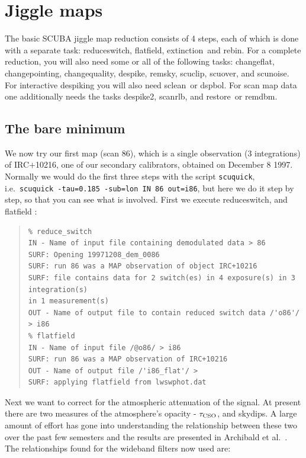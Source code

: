 \documentclass[twoside,11pt]{article}
\newenvironment{myquote}{\begin{quote}\begin{small}}{\end{small}\end{quote}}
\newcommand{\task}[1]{\textsf{#1}}
\newcommand{\rebin}{\xref{\task{rebin}}{sun216}{REBIN}}
\newcommand{\remdbm}{\xref{\task{remdbm}}{sun216}{REMDBM}}
\newcommand{\chgqual}{\xref{\task{change\_\-qua\-lity}}{sun216}{CHANGE_QUALITY}}
\newcommand{\chgflat}{\xref{\task{change\_flat}}{sun216}{CHANGE_FLAT}}
\newcommand{\chgpnt}{\xref{\task{change\_pointing}}{sun216}{CHANGE_POINTING}}
\newcommand{\desp}{\xref{\task{despike}}{sun216}{DESPIKE}}
\newcommand{\dspbol}{\xref{\task{dspbol}}{sun216}{DSPBOL}}
\newcommand{\resw}{\xref{\task{reduce\_switch}}{sun216}{REDUCE_SWITCH}}
\newcommand{\flatf}{\xref{\task{flatfield}}{sun216}{FLATFIELD}}
\newcommand{\scanrlb}{\xref{\task{scan\_rlb}}{sun216}{SCAN_RLB}}
\newcommand{\ext}{\xref{\task{extinction}}{sun216}{EXTINCTION}}
\newcommand{\remsky}{\xref{\task{remsky}}{sun216}{REMSKY}}
\newcommand{\scuover}{\xref{\task{scuover}}{sun216}{SCUOVER}}
\newcommand{\restore}{\xref{\task{restore}}{sun216}{RESTORE}}
\newcommand{\scuclip}{\xref{\task{scuclip}}{sun216}{SCUCLIP}}
\newcommand{\scunoise}{\xref{\task{scunoise}}{sun216}{SCUNOISE}}
\newcommand{\sclean}{\xref{\task{sclean}}{sun86}{SCLEAN}}
\newcommand{\xref}[3]{#1}
\newcommand{\xlabel}[1]{}
\renewcommand{\_}{\texttt{\symbol{95}}}
\begin{document}
\section{\xlabel{Jiggle_maps}Jiggle maps}

The basic SCUBA jiggle map reduction consists of 4 steps, each of
which is done with a separate task: \resw, \flatf, \ext\ and \rebin. 
For a complete reduction, you will also need some or all of the
following tasks: \chgflat, \chgpnt, \chgqual, \desp, \remsky,
\scuclip, \scuover, and \scunoise.  For interactive despiking you will
also need \sclean\ or \dspbol.  For scan map data one additionally
needs the tasks \desp2, \scanrlb, and \restore\ or \remdbm.

\subsection{\xlabel{The_bare_min}The bare minimum} 

We now try our first map (scan 86), which is a single observation (3
integrations) of IRC$+$10216, one of our secondary calibrators,
obtained on December 8 1997.  Normally we would do the first three
steps with the script \texttt{scuquick}, i.e.\ \texttt{scuquick
-tau=0.185 -sub=lon IN 86 out=i86}, but here we do it step by step, so
that you can see what is involved.  First we execute \resw, and \flatf
:

\begin{myquote}
\begin{verbatim}
% reduce_switch
IN - Name of input file containing demodulated data > 86
SURF: Opening 19971208_dem_0086
SURF: run 86 was a MAP observation of object IRC+10216
SURF: file contains data for 2 switch(es) in 4 exposure(s) in 3 
integration(s)
in 1 measurement(s)
OUT - Name of output file to contain reduced switch data /'o86'/ > i86
% flatfield
IN - Name of input file /@o86/ > i86
SURF: run 86 was a MAP observation of IRC+10216
OUT - Name of output file /'i86_flat'/ > 
SURF: applying flatfield from lwswphot.dat
\end{verbatim}
\end{myquote}

Next we want to correct for the atmospheric attenuation of the signal.
At present there are two measures of the atmosphere's opacity -
$\tau_{\rm CSO}$, and skydips. A large amount of effort has gone into
understanding the relationship between these two over the past few
semesters and the results are presented in Archibald et al.\ 
\cite{Archibald00}.  The relationships found for the wideband filters 
now
used are:
\end{document}
